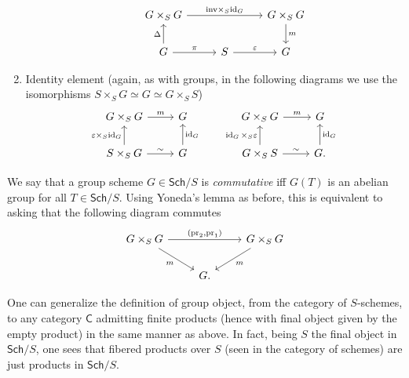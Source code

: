 \begin{rem}[]
\begin{enumerate}
\begin{equation*}
			\qquad
			\begin{tikzcd}[column sep=2.7em]
				G \times_{ S } G
				\arrow[rr, "\mathrm{inv} \times_S \id_{ G }", rightarrow] & &
				G \times_{ S } G \arrow[d, "m", rightarrow] \\
				G \arrow[u, "\Delta", rightarrow] 
				\arrow[r, "\pi", rightarrow] &
				S \arrow[r, "\varepsilon", rightarrow] & 
				G
			\end{tikzcd}
			\end{equation*} 
		\item Identity element (again, as with groups, in the following diagrams
			we use the isomorphisms
			$S \times_{ S } G \simeq G \simeq G \times_{ S } S$)
			\begin{equation*}
			\begin{tikzcd}
				G \times_{ S } G \arrow[r, "m", rightarrow] &
				G \\
				S \times_{ S } G \arrow[r, "\sim", rightarrow] 
				\arrow[u, "\varepsilon \times_S \id_{ G }", rightarrow] &
				G \arrow[u, "\id_{ G }"', rightarrow] 
			\end{tikzcd}
			\qquad
			\begin{tikzcd}
				G \times_{ S } G \arrow[r, "m", rightarrow] &
				G \\
				G \times_{ S } S \arrow[r, "\sim", rightarrow] 
				\arrow[u, "\id_{ G } \times_S \varepsilon", rightarrow] &
				G. \arrow[u, "\id_{ G }"', rightarrow] 
			\end{tikzcd}
			\end{equation*} 
	\end{enumerate}
\end{rem}


\begin{defn}
	We say that a group scheme $G \in \mathsf{Sch}/S$ is \emph{commutative}
	iff $G(T)$ is an abelian group for all $T \in \mathsf{Sch}/S$.
	Using Yoneda's lemma as before,
	this is equivalent to asking that the following diagram commutes
	\begin{equation*}
	\begin{tikzcd}
		G \times_S G \arrow[rr, "{ \left(\mathrm{pr}_2, \mathrm{pr}_1\right)}", rightarrow] 
		\arrow[rd, "m"', rightarrow] & &
		G \times_{ S } G
		\arrow[ld, "m", rightarrow] \\
					     &
		G
	.\end{tikzcd}
	\end{equation*}
\end{defn}


\begin{rem}\label{rem:groupObject}
	One can generalize the definition of group object, from the category
	of $S$-schemes, to any category $\mathsf{C}$ admitting finite products
	(hence with final object given by the empty product) in the same manner as above.
	In fact, being $S$ the final object in $\mathsf{Sch}/S$, one sees
	that fibered products over $S$ (seen in the category of schemes)
	are just products in $\mathsf{Sch}/S$.
\end{rem}


